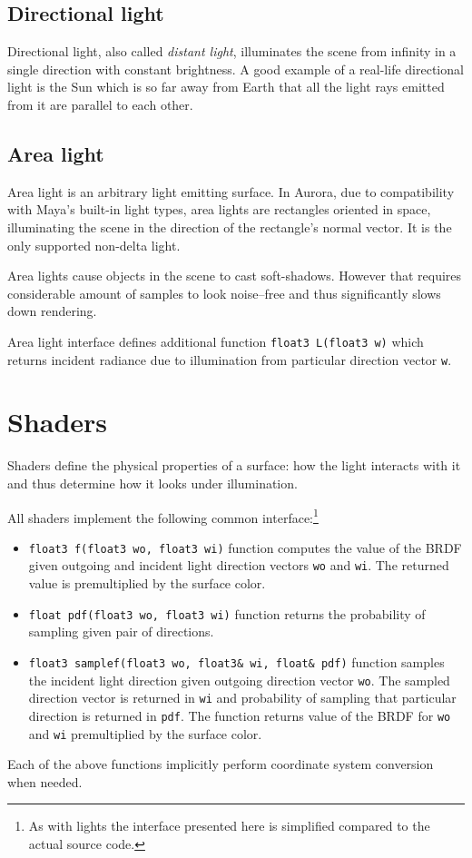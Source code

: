 \subsection{Directional light}
Directional light, also called \emph{distant light}, illuminates the scene from infinity in a single direction with constant brightness. A good example of a real-life directional light is the Sun which is so far away from Earth that all the light rays emitted from it are parallel to each other.

\subsection{Area light}
Area light is an arbitrary light emitting surface. In Aurora, due to compatibility with Maya's built-in light types, area lights are rectangles oriented in space, illuminating the scene in the direction of the rectangle's normal vector. It is the only supported non-delta light. 

Area lights cause objects in the scene to cast soft-shadows. However that requires considerable amount of samples to look noise--free and thus significantly slows down rendering.

Area light interface defines additional function \texttt{float3 L(float3 w)} which returns incident radiance due to illumination from particular direction vector \texttt{w}.

\section{Shaders}
Shaders define the physical properties of a surface: how the light interacts with it and thus determine how it looks under illumination.

All shaders implement the following common interface:\footnote{As with lights the interface presented here is simplified compared to the actual source code.}
\begin{itemize}
\item \texttt{float3 f(float3 wo, float3 wi)} function computes the value of the BRDF given outgoing and incident light direction vectors \texttt{wo} and \texttt{wi}. The returned value is premultiplied by the surface color.
\item \texttt{float pdf(float3 wo, float3 wi)} function returns the probability of sampling given pair of directions.
\item \texttt{float3 samplef(float3 wo, float3\& wi, float\& pdf)} function samples the incident light direction given outgoing direction vector \texttt{wo}. The sampled direction vector is returned in \texttt{wi} and probability of sampling that particular direction is returned in \texttt{pdf}. The function returns value of the BRDF for \texttt{wo} and \texttt{wi} premultiplied by the surface color.
\end{itemize}
Each of the above functions implicitly perform coordinate system conversion when needed.

